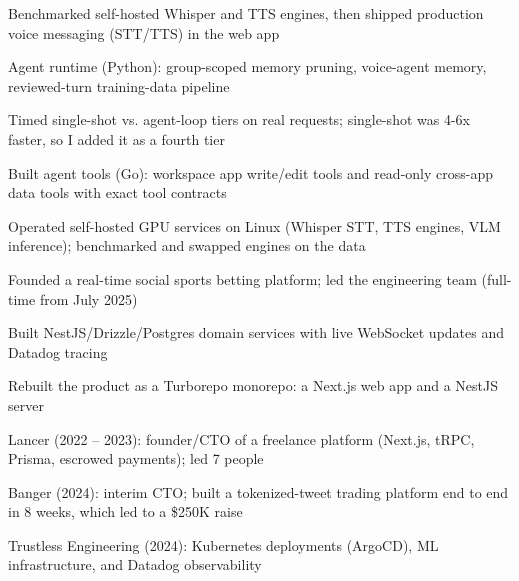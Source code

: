 \documentclass[print]{jack-resume}
\begin{document}
\begin{tightemize}
    \item Benchmarked self-hosted Whisper and TTS engines, then shipped production voice messaging (STT/TTS) in the web app
    \item Agent runtime (Python): group-scoped memory pruning, voice-agent memory, reviewed-turn training-data pipeline
    \item Timed single-shot vs. agent-loop tiers on real requests; single-shot was 4-6x faster, so I added it as a fourth tier
    \item Built agent tools (Go): workspace app write/edit tools and read-only cross-app data tools with exact tool contracts
    \item Operated self-hosted GPU services on Linux (Whisper STT, TTS engines, VLM inference); benchmarked and swapped engines on the data
\end{tightemize}
\sectionsep

\begin{tightemize}
    \item Founded a real-time social sports betting platform; led the engineering team (full-time from July 2025)
    \item Built NestJS/Drizzle/Postgres domain services with live WebSocket updates and Datadog tracing
    \item Rebuilt the product as a Turborepo monorepo: a Next.js web app and a NestJS server
\end{tightemize}
\sectionsep

\begin{tightemize}
    \item Lancer (2022 -- 2023): founder/CTO of a freelance platform (Next.js, tRPC, Prisma, escrowed payments); led 7 people
    \item Banger (2024): interim CTO; built a tokenized-tweet trading platform end to end in 8 weeks, which led to a \$250K raise
    \item Trustless Engineering (2024): Kubernetes deployments (ArgoCD), ML infrastructure, and Datadog observability
\end{tightemize}
\sectionsep
\end{document}
